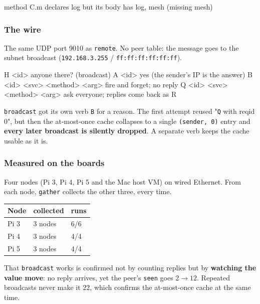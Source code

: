 \documentclass[11pt,a4paper]{article}
\begin{document}
\begin{term}
method C.m declares {log} but its body has {log, mesh} (missing {mesh})
\end{term}

\subsubsection*{The wire}

The same UDP port 9010 as \texttt{remote}. No peer table: the message goes to
the subnet broadcast (\texttt{192.168.3.255} / \texttt{ff:ff:ff:ff:ff:ff}).

\begin{term}
H <id>                          anyone there?  (broadcast)
A <id>                          yes  (the sender's IP is the answer)
B <id> <svc> <method> <arg>     fire and forget; no reply
Q <id> <svc> <method> <arg>     ask everyone; replies come back as R
\end{term}

\texttt{broadcast} got its own verb \texttt{B} for a reason. The first attempt
reused "\texttt{Q} with reqid 0", but then the at-most-once cache collapses to
a single \texttt{(sender, 0)} entry and \textbf{every later broadcast is
silently dropped}. A separate verb keeps the cache usable as it is.

\subsubsection*{Measured on the boards}

Four nodes (Pi 3, Pi 4, Pi 5 and the Mac host VM) on wired Ethernet. From each
node, \texttt{gather} collects the other three, every time.

\begin{center}
\begin{tabular}{lll}
\hline
Node & collected & runs \\
\hline
Pi 3 & 3 nodes & 6/6 \\
Pi 4 & 3 nodes & 4/4 \\
Pi 5 & 3 nodes & 4/4 \\
\hline
\end{tabular}
\end{center}

That \texttt{broadcast} works is confirmed not by counting replies but by
\textbf{watching the value move}: no reply arrives, yet the peer's
\texttt{seen} goes $2 \to 12$. Repeated broadcasts never make it $22$, which
confirms the at-most-once cache at the same time.
\end{document}
